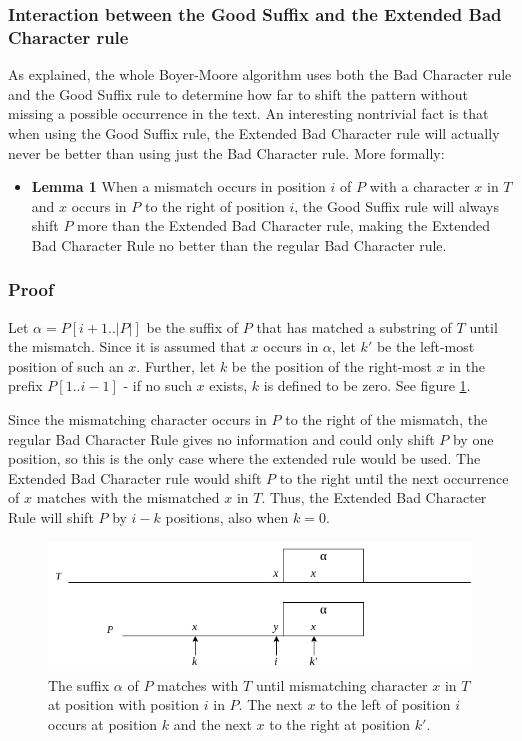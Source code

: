 \newpage
\subsubsection{Interaction between the Good Suffix and the Extended Bad Character rule}\label{sec:goodsuffixvsbadcharacter}

As explained, the whole Boyer-Moore algorithm uses both the Bad Character rule and the Good Suffix rule to determine how far to shift the pattern without missing a possible occurrence in the text. An interesting nontrivial fact is that when using the Good Suffix rule, the Extended Bad Character rule will actually never be better than using just the Bad Character rule. More formally:

\begin{itemize}
    \item[] \textbf{Lemma 1} When a mismatch occurs in position $i$ of $P$ with a character $x$ in $T$ and $x$ occurs in $P$ to the right of position $i$, the Good Suffix rule will always shift $P$ more than the Extended Bad Character rule, making the Extended Bad Character Rule no better than the regular Bad Character rule. 
\end{itemize}

\subsubsection{Proof}

Let $\alpha=P[i+1..|P|]$ be the suffix of $P$ that has matched a substring of $T$ until the mismatch. Since it is assumed that $x$ occurs in $\alpha$, let $k'$ be the left-most position of such an $x$. Further, let $k$ be the position of the right-most $x$ in the prefix $P[1..i-1]$ - if no such $x$ exists, $k$ is defined to be zero. See figure \ref{fig:suffixvsbadchar}. 

Since the mismatching character occurs in $P$ to the right of the mismatch, the regular Bad Character Rule gives no information and could only shift $P$ by one position, so this is the only case where the extended rule would be used. The Extended Bad Character rule would shift $P$ to the right until the next occurrence of $x$ matches with the mismatched $x$ in $T$. Thus, the Extended Bad Character Rule will shift $P$ by $i-k$ positions, also when $k=0$. 

\begin{figure}[ht!]
    \centering
    \includegraphics[width=\textwidth]{LaTeX/Figures/Zalg/suffixvsbadchar.png}
    \caption{The suffix $\alpha$ of $P$ matches with $T$ until mismatching character $x$ in $T$ at position with position $i$ in $P$. The next $x$ to the left of position $i$ occurs at position $k$ and the next $x$ to the right at position $k'$.}
    \label{fig:suffixvsbadchar}
\end{figure}

